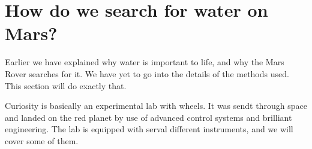 \section*{How do we search for water on Mars?}
Earlier we have explained why water is important to life, and why the Mars Rover searches for it.
We have yet to go into the details of the methods used.
This section will do exactly that.


Curiosity is basically an experimental lab with wheels.
It was sendt through space and landed on the red planet by use of advanced control systems and brilliant engineering.
The lab is equipped with serval different instruments, and we will cover some of them.

